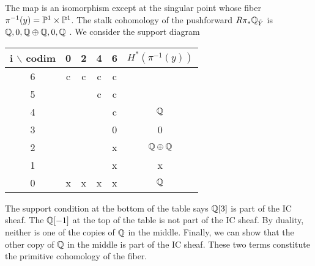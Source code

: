 The map is an isomorphism except at the singular point whose fiber $\pi^{-1}(y) = \P^1\times 
\P^1$. The stalk cohomology of the pushforward $R\pi_*\Q_{\tilde Y}$ is $\Q,0,\Q\oplus\Q,0,\Q$ 
. We consider the support diagram 
\begin{center}
    \begin{tabular}{|c|c|c|c|c|c|}
        \hline
        i $\backslash$ codim & 0 & 2 & 4 & 6 & $H^*(\pi^{-1}(y))$ \\
        \hline
        6 & c & c & c & c & \\      
        \hline
        5 &  &  & c & c &  \\
        \hline
        4 &  & & & c & $\Q$ \\
        \hline
        3 &  &  &  & 0 & 0 \\
        \hline
        2 &  &  &  & x & $\Q\oplus\Q$ \\
        \hline
        1 &  &  &  & x & x \\
        \hline
        0 & x & x & x & x & $\Q$ \\
        \hline
    \end{tabular}
\end{center}
The support condition at the bottom of the table says $\Q[3]$ is part of the IC sheaf.
The $\Q[-1]$ at the top of the table is not part of the IC sheaf. By duality, neither is one of 
the copies of $\Q$ in the middle. Finally, we can show that the other copy of $\Q$ in the middle
is part of the IC sheaf. These two terms constitute the primitive cohomology of the fiber.



